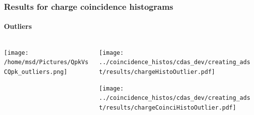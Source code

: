 \documentclass[aspectratio=169]{beamer}
\begin{document}
\begin{frame}
  \frametitle{Results for charge coincidence histograms}
  \framesubtitle{Outliers}

  \begin{columns}
    \centering
    \begin{column}{0.42\textwidth}
      \begin{minipage}{\textwidth}
        \texttt{[image: /home/msd/Pictures/QpkVsCQpk\_outliers.png]}
      \end{minipage}
    \end{column}
    \begin{column}{0.42\textwidth}
      \begin{minipage}{\textwidth}
        \texttt{[image: ../coincidence\_histos/cdas\_dev/creating\_adst/results/chargeHistoOutlier.pdf]}
      \end{minipage}
      \begin{minipage}{\textwidth}
        \texttt{[image: ../coincidence\_histos/cdas\_dev/creating\_adst/results/chargeCoinciHistoOutlier.pdf]}
      \end{minipage}
    \end{column}
  \end{columns}
\end{frame}
\end{document}
